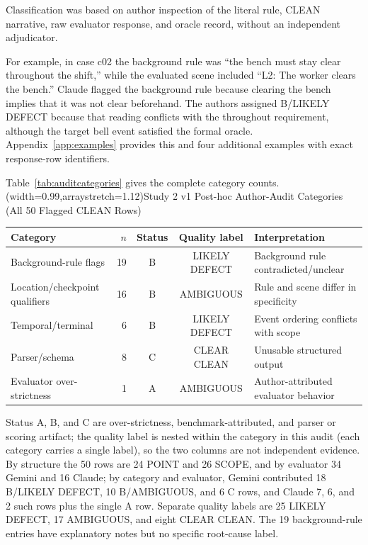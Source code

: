 \documentclass{ieeeaccess}
\begin{document}
Classification was based on author inspection of the literal rule, CLEAN narrative, raw evaluator response, and oracle record, without an independent adjudicator.

For example, in case c02 the background rule was ``the bench must stay clear throughout the shift,'' while the evaluated scene included ``L2: The worker clears the bench.'' Claude flagged the background rule because clearing the bench implies that it was not clear beforehand. The authors assigned B/LIKELY DEFECT because that reading conflicts with the throughout requirement, although the target bell event satisfied the formal oracle. Appendix~\ref{app:examples} provides this and four additional examples with exact response-row identifiers.

Table~\ref{tab:auditcategories} gives the complete category counts.
\Table[t](width=0.99\columnwidth,arraystretch=1.12){Study 2 v1 Post-hoc Author-Audit Categories (All 50 Flagged CLEAN Rows) \label{tab:auditcategories}}{\setlength{\tabcolsep}{4pt}\begin{tabularx}{\columnwidth}{@{}>{\raggedright\arraybackslash}p{}rcc>{\raggedright\arraybackslash}p{}@{}}
\toprule
Category & $n$ & Status & Quality label & Interpretation\\
\midrule
Background-rule flags & 19 & B & LIKELY DEFECT & Background rule contradicted/unclear\\
Location/checkpoint qualifiers & 16 & B & AMBIGUOUS & Rule and scene differ in specificity\\
Temporal/terminal & 6 & B & LIKELY DEFECT & Event ordering conflicts with scope\\
Parser/schema & 8 & C & CLEAR CLEAN & Unusable structured output\\
Evaluator over-strictness & 1 & A & AMBIGUOUS & Author-attributed evaluator behavior\\
\bottomrule
\end{tabularx}}

Status A, B, and C are over-strictness, benchmark-attributed, and parser or scoring artifact; the quality label is nested within the category in this audit (each category carries a single label), so the two columns are not independent evidence. By structure the 50 rows are 24 POINT and 26 SCOPE, and by evaluator 34 Gemini and 16 Claude; by category and evaluator, Gemini contributed 18 B/LIKELY DEFECT, 10 B/AMBIGUOUS, and 6 C rows, and Claude 7, 6, and 2 such rows plus the single A row. Separate quality labels are 25 LIKELY DEFECT, 17 AMBIGUOUS, and eight CLEAR CLEAN. The 19 background-rule entries have explanatory notes but no specific root-cause label.
\end{document}

